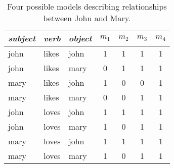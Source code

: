 \documentclass[manuscript]{clv2}
\begin{document}
\begin{table}
  \begin{center}
  \begin{tabular}{l|l|l||c|c|c|c}
    \emph{subject} & \emph{verb} & \emph{object} & $m_1$ & $m_2$ & $m_3$ & $m_4$\\
    \hline
    john & likes & john & 1 & 1 & 1 & 1\\
    john & likes & mary & 0 & 1 & 1 & 1\\
    mary & likes & john & 1 & 0 & 0 & 1\\
    mary & likes & mary & 0 & 0 & 1 & 1\\
    john & loves & john & 1 & 1 & 1 & 1\\
    john & loves & mary & 1 & 0 & 1 & 1\\
    mary & loves & john & 1 & 1 & 1 & 1\\
    mary & loves & mary & 1 & 0 & 1 & 1\\
  \end{tabular}
  \end{center}
  \vspace{0.2cm}
  \caption{Four possible models describing relationships between John
    and Mary.}
  \label{table:models}
\end{table}


\end{document}
